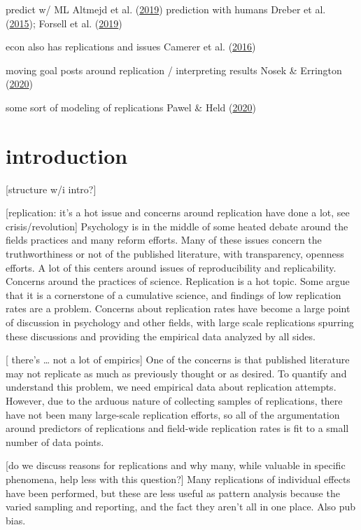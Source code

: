 \documentclass[
  english,
  a4paper,
]{article}
\begin{document}
predict w/ ML Altmejd et al. (\protect\hyperlink{ref-altmejd2019}{2019})
prediction with humans Dreber et al. (\protect\hyperlink{ref-dreber2015}{2015}); Forsell et al. (\protect\hyperlink{ref-forsell2019}{2019})

econ also has replications and issues Camerer et al. (\protect\hyperlink{ref-camerer2016}{2016})

moving goal posts around replication / interpreting results Nosek \& Errington (\protect\hyperlink{ref-nosek2020}{2020})

some sort of modeling of replications Pawel \& Held (\protect\hyperlink{ref-pawel2020}{2020})

\hypertarget{introduction}{%
\section{introduction}\label{introduction}}

{[}structure w/i intro?{]}

{[}replication: it's a hot issue and concerns around replication have done a lot, see crisis/revolution{]} Psychology is in the middle of some heated debate around the fields practices and many reform efforts. Many of these issues concern the truthworthiness or not of the published literature, with transparency, openness efforts. A lot of this centers around issues of reproducibility and replicability. Concerns around the practices of science. Replication is a hot topic. Some argue that it is a cornerstone of a cumulative science, and findings of low replication rates are a problem. Concerns about replication rates have become a large point of discussion in psychology and other fields, with large scale replications spurring these discussions and providing the empirical data analyzed by all sides.

{[} there's \ldots{} not a lot of empirics{]} One of the concerns is that published literature may not replicate as much as previously thought or as desired. To quantify and understand this problem, we need empirical data about replication attempts. However, due to the arduous nature of collecting samples of replications, there have not been many large-scale replication efforts, so all of the argumentation around predictors of replications and field-wide replication rates is fit to a small number of data points.

{[}do we discuss reasons for replications and why many, while valuable in specific phenomena, help less with this question?{]}
Many replications of individual effects have been performed, but these are less useful as pattern analysis because the varied sampling and reporting, and the fact they aren't all in one place. Also pub bias.
\end{document}
